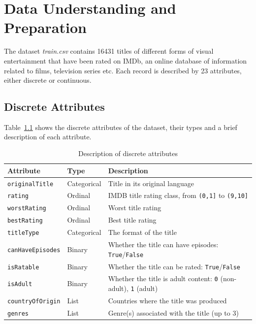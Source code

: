 \chapter{Data Understanding and Preparation}
\label{ch:capitolo1}

The dataset \textit{train.csv} contains 16431 titles of different forms of visual entertainment that have been rated on IMDb, 
an online database of information related to films, television series etc. 
Each record is described by 23 attributes, either discrete or continuous.

\section{Discrete Attributes}
Table~\ref{tab:attributes} shows the discrete attributes of the dataset,
their types and a brief description of each attribute.
\begin{table}[h]
\centering
\begin{tabular}{lll}
\toprule
\textbf{Attribute} & \textbf{Type} & \textbf{Description} \\
\midrule
\texttt{originalTitle} & Categorical & Title in its original language \\
\texttt{rating} & Ordinal & IMDB title rating class, from \texttt{(0,1]} to \texttt{(9,10]} \\
\texttt{worstRating} & Ordinal & Worst title rating \\
\texttt{bestRating} & Ordinal & Best title rating \\
\texttt{titleType} & Categorical & The format of the title \\
\texttt{canHaveEpisodes} & Binary & Whether the title can have episodes: \texttt{True}/\texttt{False} \\
\texttt{isRatable} & Binary & Whether the title can be rated: \texttt{True}/\texttt{False} \\
\texttt{isAdult} & Binary & Whether the title is adult content: \texttt{0} (non-adult), \texttt{1} (adult) \\
\texttt{countryOfOrigin} & List & Countries where the title was produced \\
\texttt{genres} & List & Genre(s) associated with the title (up to 3) \\
\bottomrule
\end{tabular}
\caption{Description of discrete attributes}
\label{tab:attributes}
\end{table}
\vspace{-1em}
